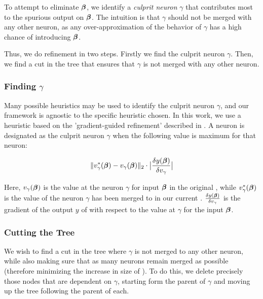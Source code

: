 To attempt to eliminate $\boldsymbol{\beta}$, we identify a \textit{culprit neuron}
$\gamma$ that contributes most to the spurious output on $\boldsymbol{\beta}$. The
intuition is that $\gamma$ should not be merged with any other neuron, as any
over-approximation of the behavior of $\gamma$ has a high chance of
introducing $\boldsymbol{\beta}$.

Thus, we do refinement in two steps. Firstly we find the culprit neuron
$\gamma$. Then, we find a cut in the tree that ensures that $\gamma$ is not
merged with any other neuron.

\subsubsection{Finding $\gamma$}

Many possible heuristics may be used to identify the culprit neuron $\gamma$,
and our framework is agnostic to the specific heuristic chosen. In this work, we
use a heuristic based on the 'gradient-guided refinement' described in
\cite{lin-comb-abs-jan}. A neuron is designated as the culprit neuron $\gamma$
when the following value is maximum for that neuron: 

\begin{equation*}
\begin{aligned}
    \|v^{*}_{\gamma}(\boldsymbol{\beta}) - v_{\gamma}(\boldsymbol{\beta})\|_{2} \cdot 
    \big| \frac{\delta y(\boldsymbol{\beta})}{\delta v_{\gamma}} \big|
\end{aligned}
\end{equation*}

Here, $v_{\gamma}(\boldsymbol{\beta})$ is the value at the neuron $\gamma$ for input
$\boldsymbol{\beta}$ in the original \cnc, while $v^{*}_{\gamma}(\boldsymbol{\beta})$ is the
value of the neuron $\gamma$ has been merged to in our current \abs.
$\frac{\delta y(\boldsymbol{\beta})}{\delta v_{\gamma}}$ is the gradient of the output
$y$ of \cnc with respect to the value at $\gamma$ for the input $\boldsymbol{\beta}$.

\subsubsection{Cutting the Tree}

We wish to find a cut in the tree where $\gamma$ is not merged to any other
neuron, while also making sure that as many neurons remain merged as possible
(therefore minimizing the increase in size of \abs). To do this, we delete
precisely those nodes that are dependent on $\gamma$, starting form the parent
of $\gamma$ and moving up the tree following the parent of each.

